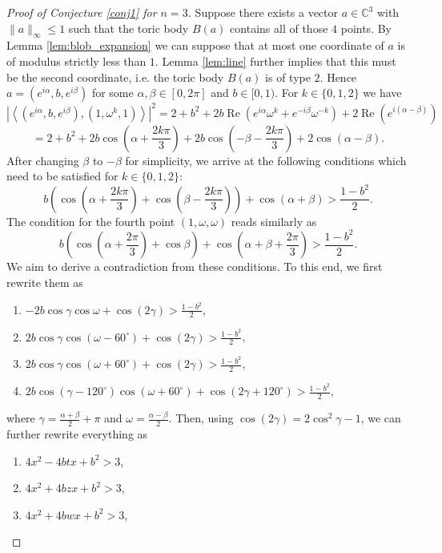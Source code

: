 \documentclass[12pt, a4paper]{article}
\theoremstyle{plain} %
\theoremstyle{definition} %
\theoremstyle{remark} %
\DeclareMathOperator{\re}{Re}
\begin{document}
\begin{proof}[Proof of Conjecture \ref{conj1} for $n=3$]
Suppose there exists a vector $a \in \mathbb{C}^3$ with $\|a\|_{\infty} \leq 1$ such that the toric body $B(a)$ contains all of those $4$ points. By Lemma \ref{lem:blob_expansion} we can suppose that at most one coordinate of $a$ is of modulus strictly less than $1$. Lemma \ref{lem:line} further implies that this must be the second coordinate, i.e. the toric body $B(a)$ is of type $2$. Hence $a = (e^{i\alpha}, b, e^{i\beta})$ for some $\alpha, \beta \in [0, 2\pi]$ and $b \in [0, 1)$. For $k \in \{0, 1, 2\}$ we have
$$\left | \left \langle (e^{i\alpha}, b, e^{i\beta}), (1, \omega^k, 1) \right \rangle \right |^2 = 2 + b^2 + 2b \re \left ( e^{i\alpha}\omega^k + e^{-i \beta} \omega^{-k} \right ) + 2\re \left ( e^{i(\alpha-\beta)} \right )$$
$$ = 2 + b^2 + 2b \cos \left ( \alpha + \frac{2k\pi}{3} \right ) + 2b \cos \left ( -\beta -  \frac{2k\pi}{3} \right ) +  2 \cos \left ( \alpha - \beta \right ).$$
After changing $\beta$ to $-\beta$ for simplicity, we arrive at the following conditions which need to be satisfied for $k \in \{0, 1, 2\}$:
$$b \left ( \cos \left ( \alpha + \frac{2k\pi}{3} \right ) + \cos \left ( \beta -  \frac{2k\pi}{3} \right ) \right ) + \cos(\alpha + \beta) > \frac{1-b^2}{2}.$$
The condition for the fourth point $(1, \omega, \omega)$ reads similarly as
$$b\left (\cos \left ( \alpha + \frac{2\pi}{3} \right ) + \cos \beta \right ) + \cos \left (\alpha + \beta + \frac{2\pi}{3} \right ) > \frac{1-b^2}{2}.$$
We aim to derive a contradiction from these conditions. To this end, we first rewrite them as
\begin{enumerate}
\item $-2b \cos \gamma \cos \omega  + \cos(2 \gamma) > \frac{1-b^2}{2}$,
\item $2b \cos \gamma \cos (\omega - 60^{\circ}) + \cos(2 \gamma) > \frac{1-b^2}{2}$,
\item $2b \cos \gamma \cos (\omega + 60^{\circ}) + \cos(2 \gamma) > \frac{1-b^2}{2}$,
\item $2b \cos (\gamma-120^{\circ}) \cos (\omega + 60^{\circ}) + \cos(2 \gamma+120^{\circ}) > \frac{1-b^2}{2}$,
\end{enumerate}
where $\gamma = \frac{\alpha+\beta}{2} + \pi$ and $\omega = \frac{\alpha - \beta}{2}$. Then, using $\cos(2 \gamma) = 2\cos^2 \gamma - 1$, we can further rewrite everything as
\begin{enumerate}
\item $4x^2 - 4btx + b^2 > 3$,
\item $4x^2 + 4bzx + b^2 > 3$,
\item $4x^2 + 4bwx + b^2 > 3$,

\end{enumerate}
\end{proof}
\end{document}
